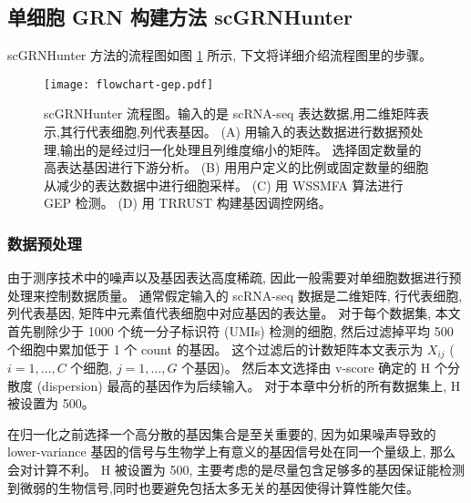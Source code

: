 \subsection{单细胞 GRN 构建方法 scGRNHunter}

scGRNHunter 方法的流程图如图 \ref{fig:gep-flowchart} 所示, 下文将详细介绍流程图里的步骤。
\begin{figure}[!htbp]
    \centering
    \texttt{[image: flowchart-gep.pdf]}
    \caption{
        scGRNHunter 流程图。输入的是 scRNA-seq 表达数据,用二维矩阵表示,其行代表细胞,列代表基因。
        (A) 用输入的表达数据进行数据预处理,输出的是经过归一化处理且列维度缩小的矩阵。
        选择固定数量的高表达基因进行下游分析。
        (B) 用用户定义的比例或固定数量的细胞从减少的表达数据中进行细胞采样。
        (C) 用 WSSMFA 算法进行 GEP 检测。
        (D) 用 TRRUST 构建基因调控网络。
    }
    \label{fig:gep-flowchart}
\end{figure}

\subsubsection{数据预处理}
由于测序技术中的噪声以及基因表达高度稀疏, 因此一般需要对单细胞数据进行预处理来控制数据质量。
通常假定输入的 scRNA-seq 数据是二维矩阵, 行代表细胞, 列代表基因, 矩阵中元素值代表细胞中对应基因的表达量。
对于每个数据集, 本文首先剔除少于 1000 个统一分子标识符 (UMIs) 检测的细胞,
然后过滤掉平均 500 个细胞中累加低于 1 个 count 的基因。
这个过滤后的计数矩阵本文表示为 $X_{ij}$ ($i=1,\ldots,C$ 个细胞, $j=1,\ldots,G$ 个基因)。
然后本文选择由 v-score  确定的 H 个分散度 (dispersion) 最高的基因作为后续输入。
对于本章中分析的所有数据集上, H 被设置为 500。

在归一化之前选择一个高分散的基因集合是至关重要的, 
因为如果噪声导致的 lower-variance 基因的信号与生物学上有意义的基因信号处在同一个量级上, 那么会对计算不利。 
H 被设置为 500, 主要考虑的是尽量包含足够多的基因保证能检测到微弱的生物信号,同时也要避免包括太多无关的基因使得计算性能欠佳。

